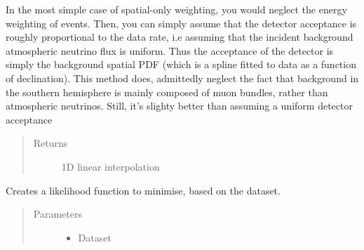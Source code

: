 \documentclass[letterpaper,10pt,english]{sphinxmanual}
\begin{document}
\begin{fulllineitems}
\begin{fulllineitems}
\end{fulllineitems}


\begin{fulllineitems}
\label{\detokenize{index:flarestack.core.llh.SpatialLLH.create_energy_function}}
In the most simple case of spatial-only weighting, you would
neglect the energy weighting of events. Then, you can simply assume
that the detector acceptance is roughly proportional to the data rate,
i.e assuming that the incident background atmospheric neutrino flux
is uniform. Thus the acceptance of the detector is simply the
background spatial PDF (which is a spline fitted to data as a
function of declination). This method does, admittedly neglect the
fact that background in the southern hemisphere is mainly composed of
muon bundles, rather than atmospheric neutrinos. Still, it’s slighty
better than assuming a uniform detector acceptance
\begin{quote}\begin{description}
\item[{Returns}] \leavevmode
1D linear interpolation

\end{description}\end{quote}

\end{fulllineitems}


\begin{fulllineitems}
\label{\detokenize{index:flarestack.core.llh.SpatialLLH.create_llh_function}}
Creates a likelihood function to minimise, based on the dataset.
\begin{quote}\begin{description}
\item[{Parameters}] \leavevmode\begin{itemize}
\item {} 
 \textendash{} Dataset


\end{itemize}
\end{description}
\end{quote}
\end{fulllineitems}
\end{fulllineitems}
\end{document}
